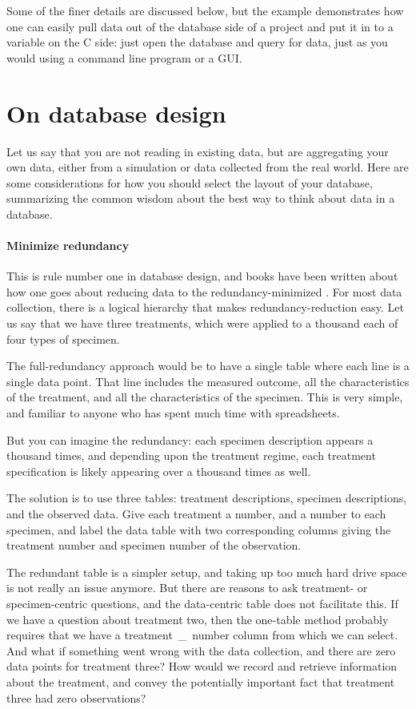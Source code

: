Some of the finer details are discussed below, but the example
demonstrates how one can easily pull data out of the database side of
a project and put it in to a variable on the C side: just open the
database and query for data, just as you would using a command line
program or a GUI.


\section{On database design}
Let us say that you are not reading in existing data, but are
aggregating your own data, either from a simulation or data
collected from the real world. Here are some considerations for how you
should select the layout of your database, summarizing the common wisdom
about the best way to think about data in a database.

\paragraph{Minimize redundancy} This is rule number one in database
design, and books have been written about how one goes about reducing
data to the redundancy-minimized . For most data collection, there is a
logical hierarchy that makes redundancy-reduction easy. Let us say that
we have three treatments, which were applied to a thousand each of four
types of specimen.

The full-redundancy approach would be to have a single table where each
line is a single data point.  That line includes the measured outcome,
all the characteristics of the treatment, and all the characteristics
of the specimen.  This is very simple, and familiar to anyone who has
spent much time with spreadsheets.

But you can imagine the redundancy: each specimen description appears a
thousand times, and depending upon the treatment regime, each treatment
specification is likely appearing over a thousand times as well.

The solution is to use three tables: treatment descriptions, specimen
descriptions, and the observed data. Give each treatment a number, and a
number to each specimen, and label the data table with two corresponding columns
giving the treatment number and specimen number of the observation.

The redundant table is a simpler setup, and taking up too much hard drive
space is not really an issue anymore. But there are reasons to ask
treatment- or specimen-centric questions, and the data-centric table
does not facilitate this. If we have a question about treatment
two, then the one-table method probably requires that we have a
\si{treatment\_number} column from which we can select. And what if
something went wrong with the data collection, and there are zero data
points for treatment three? How would we record and retrieve information
about the treatment, and convey the potentially important fact that
treatment three had zero observations?

